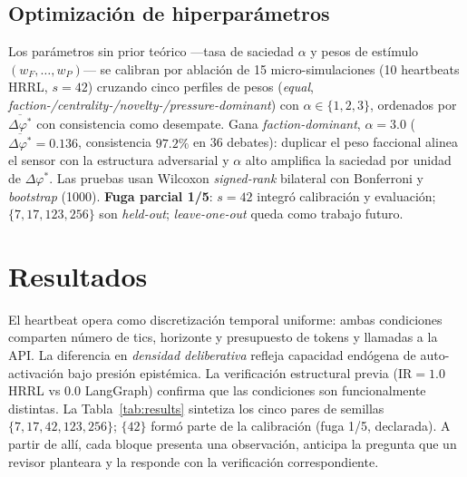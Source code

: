 \documentclass{llncs}
\begin{document}
\subsection{Optimizaci\'on de hiperpar\'ametros}

Los par\'ametros sin prior te\'orico ---tasa de saciedad $\alpha$ y
pesos de est\'imulo $(w_F,\dots,w_P)$--- se calibran por ablaci\'on
de 15 micro-simulaciones (10 heartbeats HRRL, $s{=}42$) cruzando cinco
perfiles de pesos (\emph{equal}, \emph{faction-/centrality-/novelty-/pressure-dominant})
con $\alpha\in\{1,2,3\}$, ordenados por $\overline{\Delta\varphi^*}$
con consistencia como desempate. Gana \emph{faction-dominant},
$\alpha{=}3.0$ ($\overline{\Delta\varphi^*}{=}0.136$, consistencia
$97.2\%$ en 36 debates): duplicar el peso faccional alinea el sensor
con la estructura adversarial y $\alpha$ alto amplifica la saciedad
por unidad de $\Delta\varphi^*$. Las pruebas usan Wilcoxon
\emph{signed-rank} bilateral con Bonferroni y \emph{bootstrap} (1000).
\textbf{Fuga parcial 1/5}: $s{=}42$ integr\'o calibraci\'on y
evaluaci\'on; $\{7,17,123,256\}$ son \emph{held-out};
\emph{leave-one-out} queda como trabajo futuro.

\section{Resultados}
\label{sec:results}

El heartbeat opera como discretizaci\'on temporal uniforme: ambas
condiciones comparten n\'umero de tics, horizonte y presupuesto de
tokens y llamadas a la API. La diferencia en \emph{densidad
deliberativa} refleja capacidad end\'ogena de auto-activaci\'on bajo
presi\'on epist\'emica. La verificaci\'on estructural previa
($\mathrm{IR}{=}1.0$ HRRL vs $0.0$ LangGraph) confirma que las
condiciones son funcionalmente distintas. La Tabla~\ref{tab:results}
sintetiza los cinco pares de semillas $\{7,17,42,123,256\}$;
$\{42\}$ form\'o parte de la calibraci\'on (fuga 1/5, declarada). A
partir de all\'i, cada bloque presenta una observaci\'on, anticipa la
pregunta que un revisor planteara y la responde con la verificaci\'on
correspondiente.
\end{document}
